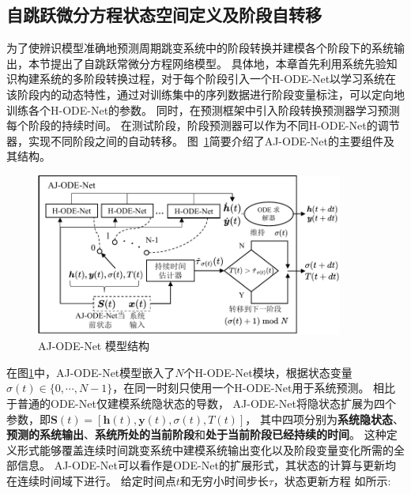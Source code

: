 \subsection{自跳跃微分方程状态空间定义及阶段自转移}
为了使辨识模型准确地预测周期跳变系统中的阶段转换并建模各个阶段下的系统输出，本节提出了自跳跃常微分方程网络模型。
具体地，本章首先利用系统先验知识构建系统的多阶段转换过程，对于每个阶段引入一个H-ODE-Net以学习系统在该阶段内的动态特性，通过对训练集中的序列数据进行阶段变量标注，可以定向地训练各个H-ODE-Net的参数。
同时，在预测框架中引入阶段转换预测器学习预测每个阶段的持续时间。
在测试阶段，阶段预测器可以作为不同H-ODE-Net的调节器，实现不同阶段之间的自动转移。
图~\ref{fig:AJ_ODEs}简要介绍了AJ-ODE-Net的主要组件及其结构。
\begin{figure}
    \centering
    \includegraphics[width=0.9\textwidth]{figures/chapter4/Jump-ODEnet.pdf}
    \caption{AJ-ODE-Net 模型结构}
    \label{fig:AJ_ODEs}
\end{figure}

在图\ref{fig:AJ_ODEs}中，AJ-ODE-Net模型嵌入了$N$个H-ODE-Net模块，根据状态变量$\sigma(t)\in \{0,\cdots,N-1\}$，在同一时刻只使用一个H-ODE-Net用于系统预测。
相比于普通的ODE-Net仅建模系统隐状态的导数，
AJ-ODE-Net将隐状态扩展为四个参数，即$\boldsymbol{S}(t) = [\boldsymbol h(t), \boldsymbol y(t), \sigma(t), T(t)]$，
其中四项分别为\textbf{系统隐状态}、\textbf{预测的系统输出}、\textbf{系统所处的当前阶段}和\textbf{处于当前阶段已经持续的时间}。
这种定义形式能够覆盖连续时间跳变系统中建模系统输出变化以及阶段变量变化所需的全部信息。
AJ-ODE-Net可以看作是ODE-Net的扩展形式，其状态的计算与更新均在连续时间域下进行。
给定时间点$t$和无穷小时间步长$\tau$，状态更新方程
如所示:

